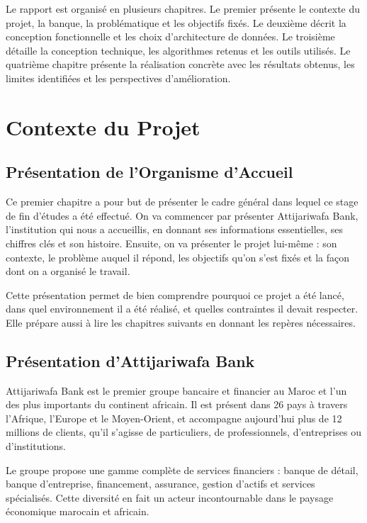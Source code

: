 \documentclass[11pt,a4paper,twoside]{report}
\begin{document}
Le rapport est organisé en plusieurs chapitres. Le premier présente le contexte du projet, la banque, la problématique et les objectifs fixés. Le deuxième décrit la conception fonctionnelle et les choix d'architecture de données. Le troisième détaille la conception technique, les algorithmes retenus et les outils utilisés. Le quatrième chapitre présente la réalisation concrète avec les résultats obtenus, les limites identifiées et les perspectives d'amélioration.

\chapter{Contexte du Projet}

\section{Présentation de l'Organisme d'Accueil}

Ce premier chapitre a pour but de présenter le cadre général dans lequel ce stage de fin d'études a été effectué. On va commencer par présenter Attijariwafa Bank, l'institution qui nous a accueillis, en donnant ses informations essentielles, ses chiffres clés et son histoire. Ensuite, on va présenter le projet lui-même : son contexte, le problème auquel il répond, les objectifs qu'on s'est fixés et la façon dont on a organisé le travail.

Cette présentation permet de bien comprendre pourquoi ce projet a été lancé, dans quel environnement il a été réalisé, et quelles contraintes il devait respecter. Elle prépare aussi à lire les chapitres suivants en donnant les repères nécessaires.

\section{Présentation d'Attijariwafa Bank}

Attijariwafa Bank est le premier groupe bancaire et financier au Maroc et l'un des plus importants du continent africain. Il est présent dans 26 pays à travers l'Afrique, l'Europe et le Moyen-Orient, et accompagne aujourd'hui plus de 12 millions de clients, qu'il s'agisse de particuliers, de professionnels, d'entreprises ou d'institutions.

Le groupe propose une gamme complète de services financiers : banque de détail, banque d'entreprise, financement, assurance, gestion d'actifs et services spécialisés. Cette diversité en fait un acteur incontournable dans le paysage économique marocain et africain.
\end{document}
